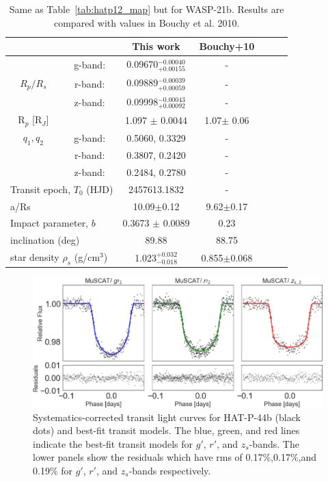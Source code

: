 \begin{table}
\centering
\caption{Same as Table~\ref{tab:hatp12_map} but for WASP-21b. Results are compared with values in Bouchy et al. 2010.}
\label{tab:wasp21_map}
\begin{tabular}{ccccccc}
\multicolumn{2}{l}{}                     & This work            & Bouchy+10 & \\ \hline
\multirow{3}{*}{$R_p/R_s$}& g-band:      & 0.09670$^{-0.00040}_{+0.00155}$ & -  & \\
                          & r-band:      & 0.09889$^{-0.00039}_{+0.00059}$ & -  & \\
                          & z-band:      & 0.09998$^{-0.00043}_{+0.00092}$ & -  & \\ \hline
R$_p$ [R$_J$]             & & 1.097 $\pm$ 0.0044 & 1.07$\pm$ 0.06 \\
$q_1, q_2$                & g-band:      & 0.5060, 0.3329 & - & \\
                          & r-band:      & 0.3807, 0.2420 & - & \\
                          & z-band:      & 0.2484, 0.2780 & - & \\ \hline
\multicolumn{2}{l}{Transit epoch, $T_0$ (HJD)} & 2457613.1832 & - & \\
\multicolumn{2}{l}{a/Rs}                     & 10.09$\pm$0.12 & 9.62$\pm$0.17 \\
\multicolumn{2}{l}{Impact parameter, $b$}    & 0.3673 $\pm$ 0.0089 & 0.23 &   \\
\multicolumn{2}{l}{inclination (deg)}        & 89.88       & 88.75 & \\  
\multicolumn{2}{l}{star density $\rho_s$ (g/cm$^3$)}        & 1.023$_{-0.018}^{+0.032}$ & 0.855$\pm$0.068  \\  
\hline  
\end{tabular}
\end{table}

\begin{figure}
\centering
	\includegraphics[width=1\columnwidth]{hatp12/grz_with_rms.png}
    \caption{Systematics-corrected transit light curves for HAT-P-44b (black dots) and best-fit transit models. %
    The blue, green, and red lines indicate the best-fit transit models for $g'$, $r'$, and $z_s$-bands. The lower panels show the residuals which have rms of 0.17\%,0.17\%,and 0.19\% for $g'$, $r'$, and $z_s$-bands respectively.}
\label{fig:hatp12_grz_multi}
\end{figure}

